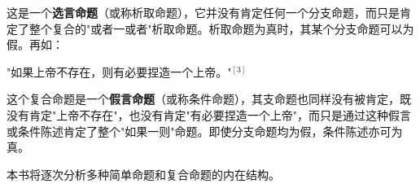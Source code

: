 这是一个\textbf{选言命题}（或称析取命题），它并没有肯定任何一个分支命题，而只是肯定了整个复合的"或者一或者"析取命题。析取命题为真时，其某个分支命题可以为假。再如：

\begin{center}
"如果上帝不存在，则有必要捏造一个上帝。"${}^{[3]}$
\end{center}

这个复合命题是一个\textbf{假言命题}（或称条件命题），其支命题也同样没有被肯定，既没有肯定"上帝不存在"，也没有肯定"有必要捏造一个上帝"，而只是通过这种假言或条件陈述肯定了整个"如果一则"命题。即使分支命题均为假，条件陈述亦可为真。

\begin{center}
\end{center}

本书将逐次分析多种简单命题和复合命题的内在结构。 